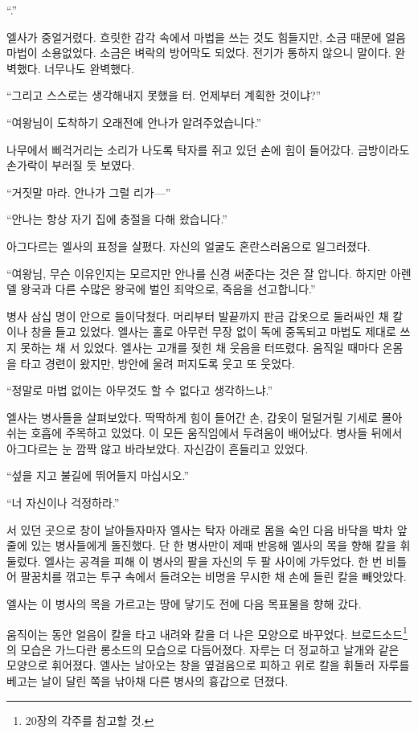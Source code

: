 ``.''

엘사가 중얼거렸다. 흐릿한 감각 속에서 마법을 쓰는 것도 힘들지만, 소금 때문에 얼음 마법이 소용없었다. 소금은 벼락의 방어막도 되었다. 전기가 통하지 않으니 말이다. 완벽했다. 너무나도 완벽했다.

``그리고 스스로는 생각해내지 못했을 터. 언제부터 계획한 것이냐?''

``여왕님이 도착하기 오래전에 안나가 알려주었습니다.''

나무에서 삐걱거리는 소리가 나도록 탁자를 쥐고 있던 손에 힘이 들어갔다. 금방이라도 손가락이 부러질 듯 보였다.

``거짓말 마라. 안나가 그럴 리가—''

``안나는 항상 자기 집에 충절을 다해 왔습니다.''

아그다르는 엘사의 표정을 살폈다. 자신의 얼굴도 혼란스러움으로 일그러졌다.

``여왕님, 무슨 이유인지는 모르지만 안나를 신경 써준다는 것은 잘 압니다. 하지만 아렌델 왕국과 다른 수많은 왕국에 벌인 죄악으로, 죽음을 선고합니다.''

병사 삼십 명이 안으로 들이닥쳤다. 머리부터 발끝까지 판금 갑옷으로 둘러싸인 채 칼이나 창을 들고 있었다. 엘사는 홀로 아무런 무장 없이 독에 중독되고 마법도 제대로 쓰지 못하는 채 서 있었다. 엘사는 고개를 젖힌 채 웃음을 터뜨렸다. 움직일 때마다 온몸을 타고 경련이 왔지만, 방안에 울려 퍼지도록 웃고 또 웃었다.

``정말로 마법 없이는 아무것도 할 수 없다고 생각하느냐.''

엘사는 병사들을 살펴보았다. 딱딱하게 힘이 들어간 손, 갑옷이 덜덜거릴 기세로 몰아쉬는 호흡에 주목하고 있었다. 이 모든 움직임에서 두려움이 배어났다. 병사들 뒤에서 아그다르는 눈 깜짝 않고 바라보았다. 자신감이 흔들리고 있었다.

``섶을 지고 불길에 뛰어들지 마십시오.''

``너 자신이나 걱정하라.''

서 있던 곳으로 창이 날아들자마자 엘사는 탁자 아래로 몸을 숙인 다음 바닥을 박차 앞줄에 있는 병사들에게 돌진했다. 단 한 병사만이 제때 반응해 엘사의 목을 향해 칼을 휘둘렀다. 엘사는 공격을 피해 이 병사의 팔을 자신의 두 팔 사이에 가두었다. 한 번 비틀어 팔꿈치를 꺾고는 투구 속에서 들려오는 비명을 무시한 채 손에 들린 칼을 빼앗았다.

엘사는 이 병사의 목을 가르고는 땅에 닿기도 전에 다음 목표물을 향해 갔다.

움직이는 동안 얼음이 칼을 타고 내려와 칼을 더 나은 모양으로 바꾸었다. 브로드소드\footnote{20장의 각주를 참고할 것.}의 모습은 가느다란 롱소드의 모습으로 다듬어졌다. 자루는 더 정교하고 날개와 같은 모양으로 휘어졌다. 엘사는 날아오는 창을 옆걸음으로 피하고 위로 칼을 휘둘러 자루를 베고는 날이 달린 쪽을 낚아채 다른 병사의 흉갑으로 던졌다.


